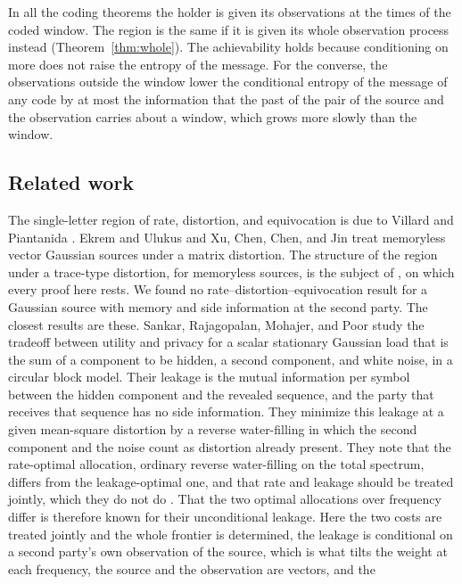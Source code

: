 \documentclass[11pt,onecolumn]{IEEEtran}
\begin{document}
In all the coding theorems the holder is given its observations at the
times of the coded window. The region is the same if it is given its
whole observation process instead (Theorem~\ref{thm:whole}). The
achievability holds because conditioning on more does not raise the
entropy of the message. For the converse, the observations outside the
window lower the conditional entropy of the message of any code by at most the information that
the past of the pair of the source and the observation carries about a
window, which grows more slowly than the window.

\subsection*{Related work}

The single-letter region of rate, distortion, and equivocation is due
to Villard and Piantanida \cite{villard2013}. Ekrem and Ulukus
\cite{ekrem2013} and Xu, Chen, Chen, and Jin \cite{xu2024} treat
memoryless vector Gaussian sources under a matrix distortion. The
structure of the region under a trace-type distortion, for memoryless
sources, is the subject of \cite{part1}, on which every proof here
rests. We found no rate--distortion--equivocation result for a Gaussian
source with memory and side information at the second party. The
closest results are these. Sankar, Rajagopalan, Mohajer, and Poor
\cite{sankar2011,sankar2013} study the tradeoff between utility and
privacy for a scalar stationary Gaussian load that is the sum of a
component to be hidden, a second component, and white noise, in a
circular block model. Their leakage is the mutual information per
symbol between the hidden component and the revealed sequence, and the
party that receives that sequence has no side information. They
minimize this leakage at a given mean-square distortion by a reverse
water-filling in which the second component and the noise count as
distortion already present. They note that the rate-optimal
allocation, ordinary reverse water-filling on the total spectrum,
differs from the leakage-optimal one, and that rate and leakage should
be treated jointly, which they do not do
\cite[Remarks~10 and~11]{sankar2013}. That the two optimal
allocations over frequency differ is therefore known for their
unconditional leakage. Here the two costs are treated jointly and the
whole frontier is determined, the leakage is conditional on a second
party's own observation of the source, which is what tilts the weight
at each frequency, the source and the observation are vectors, and the
\end{document}
